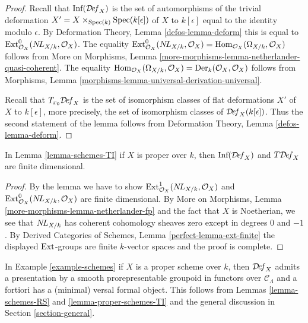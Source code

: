 \begin{proof}
Recall that $\text{Inf}(\mathcal{D}\!\mathit{ef}_X)$ is the set of
automorphisms of the trivial deformation
$X' = X \times_{\mathop{\mathrm{Spec}}(k)} \mathop{\mathrm{Spec}}(k[\epsilon])$ of $X$ to $k[\epsilon]$
equal to the identity modulo $\epsilon$.
By Deformation Theory, Lemma \ref{defos-lemma-deform}
this is equal to $\text{Ext}^0_{\mathcal{O}_X}(\mathop{N\!L}\nolimits_{X/k}, \mathcal{O}_X)$.
The equality $\text{Ext}^0_{\mathcal{O}_X}(\mathop{N\!L}\nolimits_{X/k}, \mathcal{O}_X) =
\mathop{\mathrm{Hom}}\nolimits_{\mathcal{O}_X}(\Omega_{X/k}, \mathcal{O}_X)$ follows from
More on Morphisms, Lemma
\ref{more-morphisms-lemma-netherlander-quasi-coherent}.
The equality
$\mathop{\mathrm{Hom}}\nolimits_{\mathcal{O}_X}(\Omega_{X/k}, \mathcal{O}_X) =
\text{Der}_k(\mathcal{O}_X, \mathcal{O}_X)$
follows from Morphisms, Lemma
\ref{morphisms-lemma-universal-derivation-universal}.

\medskip\noindent
Recall that $T_{x_0}\mathcal{D}\!\mathit{ef}_X$ is the set of isomorphism classes
of flat deformations $X'$ of $X$ to $k[\epsilon]$, more precisely,
the set of isomorphism classes of $\mathcal{D}\!\mathit{ef}_X(k[\epsilon])$.
Thus the second statement of the lemma follows from
Deformation Theory, Lemma \ref{defos-lemma-deform}.
\end{proof}

\begin{lemma}
\label{lemma-proper-schemes-TI}
In Lemma \ref{lemma-schemes-TI} if $X$ is proper over $k$, then
$\text{Inf}(\mathcal{D}\!\mathit{ef}_X)$ and $T\mathcal{D}\!\mathit{ef}_X$ are
finite dimensional.
\end{lemma}

\begin{proof}
By the lemma we have to show
$\mathop{\mathrm{Ext}}\nolimits^1_{\mathcal{O}_X}(\mathop{N\!L}\nolimits_{X/k}, \mathcal{O}_X)$ and
$\mathop{\mathrm{Ext}}\nolimits^0_{\mathcal{O}_X}(\mathop{N\!L}\nolimits_{X/k}, \mathcal{O}_X)$ are finite
dimensional. By More on Morphisms, Lemma
\ref{more-morphisms-lemma-netherlander-fp}
and the fact that $X$ is Noetherian, we see that
$\mathop{N\!L}\nolimits_{X/k}$ has coherent cohomology sheaves zero except
in degrees $0$ and $-1$.
By Derived Categories of Schemes, Lemma \ref{perfect-lemma-ext-finite}
the displayed $\mathop{\mathrm{Ext}}\nolimits$-groups are finite $k$-vector spaces
and the proof is complete.
\end{proof}

\noindent
In Example \ref{example-schemes} if $X$ is a proper scheme over $k$,
then $\mathcal{D}\!\mathit{ef}_X$
admits a presentation by a smooth prorepresentable groupoid in functors
over $\mathcal{C}_\Lambda$
and a fortiori has a (minimal) versal formal object. This follows
from Lemmas \ref{lemma-schemes-RS} and
\ref{lemma-proper-schemes-TI}
and the general discussion in Section \ref{section-general}.

